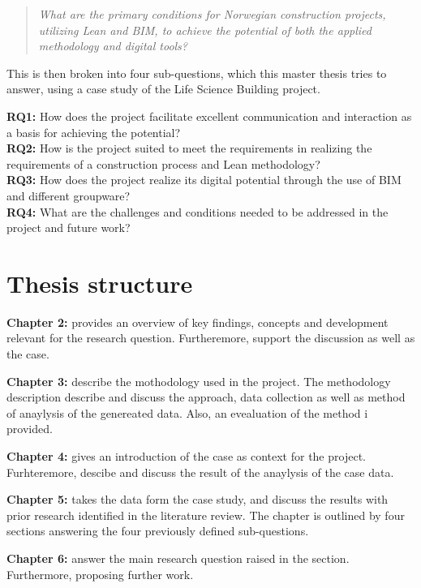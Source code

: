 \begin{quote}
    \textit{What are the primary conditions for Norwegian construction projects, utilizing Lean and BIM, to achieve the potential of both the applied methodology and digital tools?} 
\end{quote}

This is then broken into four sub-questions, which this master thesis tries to answer, using a case study of the Life Science Building project.

{\noindent \bf RQ1:} How does the project facilitate excellent communication and interaction as a basis for achieving the potential? \\
{\noindent  \bf RQ2:} How is the project suited to meet the requirements in realizing the requirements of a construction process and Lean methodology? \\
{\noindent  \bf RQ3:} How does the project realize its digital potential through the use of BIM and different groupware? \\
{\noindent  \bf RQ4:} What are the challenges and conditions needed to be addressed in the project and future work? \\

\section{Thesis structure} \label{sec:thesis}

{\noindent \bf Chapter 2: } provides an overview of key findings, concepts and development relevant for the research question. Furtheremore, support the discussion as well as the case. 

{\noindent \bf Chapter 3: } describe the mothodology used in the project. The methodology description describe and discuss the approach, data collection as well as method of anaylysis of the genereated data. Also, an evealuation of the method i provided.

{\noindent \bf Chapter 4: } gives an introduction of the case as context for the project. Furhteremore, descibe and discuss the result of the anaylysis of the case data. 

{\noindent \bf Chapter 5: } takes the data form the case study, and discuss the results with prior research identified in the literature review. The chapter is outlined by four sections answering the four previously defined sub-questions.

{\noindent \bf Chapter 6: } answer the main research question raised in the  section. Furthermore, proposing further work.


\cleardoublepage
